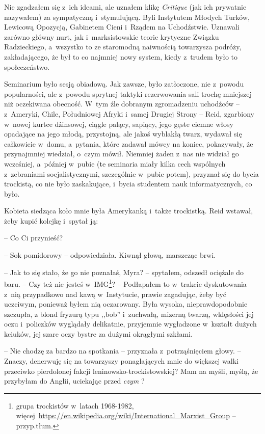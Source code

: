 \documentclass[oneside,polish,11pt,sfheadings]{mwbk}
\begin{document}
Nie zgadzałem się z~ich ideami, ale uznałem klikę \emph{Critique} (jak
ich prywatnie nazywałem) za sympatyczną i~stymulującą. Byli Instytutem
Młodych Turków, Lewicową Opozycją, Gabinetem Cieni i~Rządem na
Uchodźstwie. Uznawali zarówno główny nurt, jak i~marksistowskie teorie
krytyczne Związku Radzieckiego, a~wszystko to ze staromodną naiwnością
towarzysza podróży, zakładającego, że był to co najmniej nowy system,
kiedy z~trudem było to społeczeństwo.

Seminarium było sesją obiadową. Jak zawsze, było zatłoczone, nie z~powodu popularności, ale z~powodu sprytnej taktyki rezerwowania sali
trochę mniejszej niż oczekiwana obecność. W~tym źle dobranym
zgromadzeniu uchodźców -- z~Ameryki, Chile, Południowej Afryki i~samej
Drugiej Strony -- Reid, zgarbiony w~nowej kurtce dżinsowej, ciągle
palący, sapiący, jego gęste ciemne włosy opadające na jego młodą,
przystojną, ale jakoś wyblakłą twarz, wydawał się całkowicie w~domu, a~pytania, które zadawał mówcy na koniec, pokazywały, że przynajmniej
wiedział, o~czym mówił. Niemniej żaden z~nas nie widział go wcześniej, a~później w~pubie (te seminaria miały kilka cech wspólnych z~zebraniami
socjalistycznymi, szczególnie w~pubie potem), przyznał się do bycia
trockistą, co nie było zaskakujące, i~bycia studentem nauk
informatycznych, co było.

Kobieta siedząca koło mnie była Amerykanką i~także trockistką. Reid
wstawał, żeby kupić kolejkę i~spytał ją: 

-- Co Ci przynieść?

-- Sok pomidorowy -- odpowiedziała. Kiwnął głową, marszcząc brwi.

-- Jak to się stało, że go nie poznałaś, Myra? -- spytałem, odszedł
ociężale do baru. -- Czy też nie jesteś w~IMG\footnote{grupa trockistów w~latach 1968-1982, więcej~\url{https://en.wikipedia.org/wiki/International_Marxist_Group} -- przyp.tłum.}? -- Podłapałem to w~trakcie dyskutowania z~nią
przypadkowo nad kawą w~Instytucie, prawie zagadując, żeby być uczciwym,
ponieważ byłem nią oczarowany. Była wysoka, nieprawdopodobnie szczupła,
z blond fryzurą typu ,,bob'' i~zuchwałą, mizerną twarzą, wklęsłości jej
oczu i~policzków wyglądały delikatnie, przyjemnie wygładzone w~kształt
dużych kciuków, jej szare oczy bystre za dużymi okrągłymi szkłami.

-- Nie chodzę za bardzo na spotkania -- przyznała z~potrząśnięciem głowy.
-- Znaczy, denerwuję się na towarzyszy ponaglających mnie do większej
walki przeciwko pierdolonej fakcji leninowsko-trockistowskiej? Mam na
myśli, myślą, że przybyłam do Anglii, uciekając przed \emph{czym} ?
\end{document}
